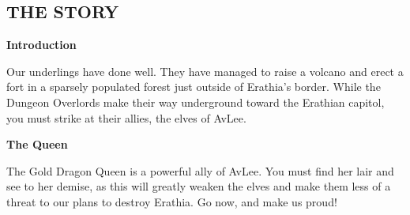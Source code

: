 \begin{minipage}{\textwidth}
  \vspace{-2em}
\end{minipage}

\begin{multicols*}{2}

\vspace*{\fill}

\subsection*{\MakeUppercase{The Story}}


\textbf{Introduction}

Our underlings have done well.
They have managed to raise a volcano and erect a fort in a sparsely populated forest just outside of Erathia's border.
While the Dungeon Overlords make their way underground toward the Erathian capitol, you must strike at their allies, the elves of AvLee.

\textbf{The Queen}

The Gold Dragon Queen is a powerful ally of AvLee.
You must find her lair and see to her demise, as this will greatly weaken the elves and make them less of a threat to our plans to destroy Erathia.
Go now, and make us proud!

\columnbreak


\end{multicols*}

